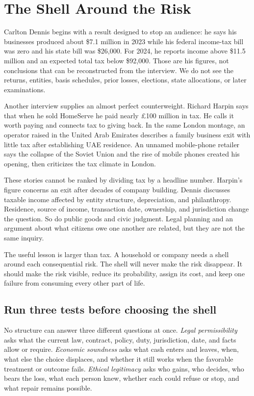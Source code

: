 \chapter{The Shell Around the Risk}

Carlton Dennis begins with a result designed to stop an audience: he says his
businesses produced about \$7.1 million in 2023 while his federal income-tax
bill was zero and his state bill was \$26,000. For 2024, he reports income above
\$11.5 million and an expected total tax below \$92,000. Those are his figures,
not conclusions that can be reconstructed from the interview. We do not see
the returns, entities, basis schedules, prior losses, elections, state
allocations, or later examinations.

Another interview supplies an almost perfect counterweight. Richard Harpin
says that when he sold HomeServe he paid nearly \pounds100 million in tax. He
calls it worth paying and connects tax to giving back. In the same London
montage, an operator raised in the United Arab Emirates describes a family
business exit with little tax after establishing UAE residence. An unnamed
mobile-phone retailer says the collapse of the Soviet Union and the rise of
mobile phones created his opening, then criticizes the tax climate in London.

These stories cannot be ranked by dividing tax by a headline number. Harpin's
figure concerns an exit after decades of company building. Dennis discusses
taxable income affected by entity structure, depreciation, and philanthropy.
Residence, source of income, transaction date, ownership, and jurisdiction
change the question. So do public goods and civic judgment. Legal planning and
an argument about what citizens owe one another are related, but they are not
the same inquiry.

The useful lesson is larger than tax. A household or company needs a shell
around each consequential risk. The shell will never make the risk disappear.
It should make the risk visible, reduce its probability, assign its cost, and
keep one failure from consuming every other part of life.

\section{Run three tests before choosing the shell}

No structure can answer three different questions at once. \emph{Legal
permissibility} asks what the current law, contract, policy, duty,
jurisdiction, date, and facts allow or require. \emph{Economic soundness} asks
what cash enters and leaves, when, what else the choice displaces, and whether
it still works when the favorable treatment or outcome fails. \emph{Ethical
legitimacy} asks who gains, who decides, who bears the loss, what each person
knew, whether each could refuse or stop, and what repair remains possible.

